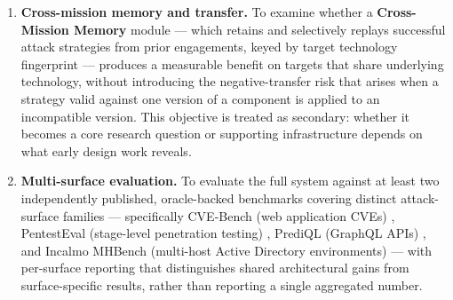 \begin{enumerate}
	\item \textbf{Cross-mission memory and transfer.} To examine whether a \textbf{Cross-Mission Memory} module --- which retains and selectively replays successful attack strategies from prior engagements, keyed by target technology fingerprint --- produces a measurable benefit on targets that share underlying technology, without introducing the negative-transfer risk that arises when a strategy valid against one version of a component is applied to an incompatible version. This objective is treated as secondary: whether it becomes a core research question or supporting infrastructure depends on what early design work reveals.

	\item \textbf{Multi-surface evaluation.} To evaluate the full system against at least two independently published, oracle-backed benchmarks covering distinct attack-surface families --- specifically CVE-Bench (web application CVEs) \citep{zhu2025cvebench}, PentestEval (stage-level penetration testing) \citep{yang2025pentesteval}, PrediQL (GraphQL APIs) \citep{liu2025prediql}, and Incalmo MHBench (multi-host Active Directory environments) \citep{singer2025incalmo} --- with per-surface reporting that distinguishes shared architectural gains from surface-specific results, rather than reporting a single aggregated number.
\end{enumerate}
